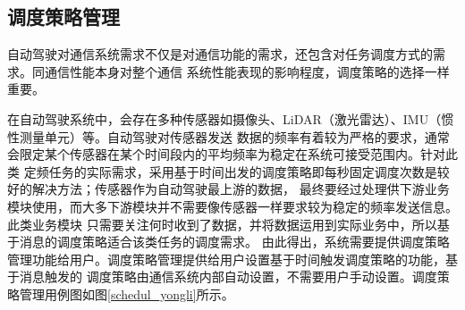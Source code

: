 
\subsection{调度策略管理}
自动驾驶对通信系统需求不仅是对通信功能的需求，还包含对任务调度方式的需求。同通信性能本身对整个通信
系统性能表现的影响程度，调度策略的选择一样重要。

在自动驾驶系统中，会存在多种传感器如摄像头、LiDAR（激光雷达）、IMU（惯性测量单元）等。自动驾驶对传感器发送
数据的频率有着较为严格的要求，通常会限定某个传感器在某个时间段内的平均频率为稳定在系统可接受范围内。针对此类
定频任务的实际需求，采用基于时间出发的调度策略即每秒固定调度次数是较好的解决方法；传感器作为自动驾驶最上游的数据，
最终要经过处理供下游业务模块使用，而大多下游模块并不需要像传感器一样要求较为稳定的频率发送信息。此类业务模块
只需要关注何时收到了数据，并将数据运用到实际业务中，所以基于消息的调度策略适合该类任务的调度需求。
由此得出，系统需要提供调度策略管理功能给用户。调度策略管理提供给用户设置基于时间触发调度策略的功能，基于消息触发的
调度策略由通信系统内部自动设置，不需要用户手动设置。调度策略管理用例图如图\ref{schedul_yongli}所示。

